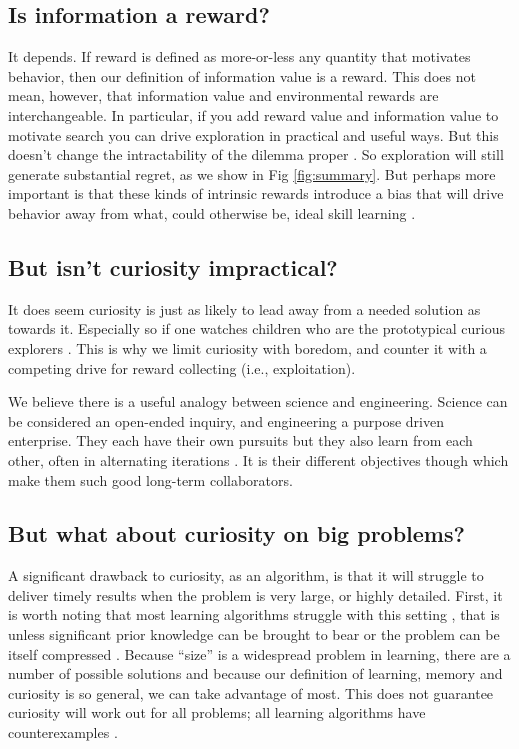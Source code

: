 \subsection*{Is information a reward?}
It depends. If reward is defined as more-or-less any quantity that motivates behavior, then our definition of information value is a reward. This does not mean, however, that information value and environmental rewards are interchangeable. In particular, if you add reward value and information value to motivate search you can drive exploration in practical and useful ways. But this doesn't change the intractability of the dilemma proper \citep{Thrun1992a,Dayan1996,Findling2018,Gershman2018b}. So exploration will still generate substantial regret, as we show in Fig \ref{fig:summary}. But perhaps more important is that these kinds of intrinsic rewards \citep{Schmidhuber1991,Berger-Tal2014,Itti2009,Friston2016,Kobayashi2019} introduce a bias that will drive behavior away from what, could otherwise be, ideal skill learning \citep{Ng1999,Simsek2006}.


\subsection*{But isn't curiosity impractical?}
It does seem curiosity is just as likely to lead away from a needed solution as towards it. Especially so if one watches children who are the prototypical curious explorers \citep{Sumner2019,Kidd2015}. This is why we limit curiosity with boredom, and counter it with a competing drive for reward collecting (i.e., exploitation). 

We believe there is a useful analogy between science and engineering. Science can be considered an open-ended inquiry, and engineering a purpose driven enterprise. They each have their own pursuits but they also learn from each other, often in alternating iterations \citep{Gupta2006}. It is their different objectives though which make them such good long-term collaborators.


\subsection*{But what about curiosity on big problems?}
A significant drawback to curiosity, as an algorithm, is that it will struggle to deliver timely results when the problem is very large, or highly detailed. First, it is worth noting that most learning algorithms struggle with this setting \citep{MacKay2003,Sutton2018}, that is unless significant prior knowledge can be brought to bear \citep{Zhang2020,Sutton2018} or the problem can be itself compressed \citep{Ha2018a,Fister2019}. Because ``size'' is a widespread problem in learning, there are a number of possible solutions and because our definition of learning, memory and curiosity is so general, we can take advantage of most. This does not guarantee curiosity will work out for all problems; all learning algorithms have counterexamples \citep{Wolpert1997}. 


